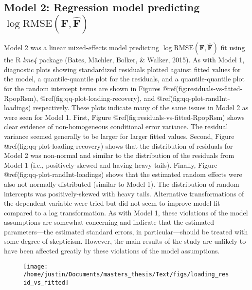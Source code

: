 \begin{appendix}
{\subsection{\texorpdfstring{Model 2: Regression model predicting
\(\log \textrm{RMSE}(\mathbf{F}, \hat{\mathbf{F}})\)}{Model 2: Regression model predicting \textbackslash log \textbackslash textrm\{RMSE\}(\textbackslash mathbf\{F\}, \textbackslash hat\{\textbackslash mathbf\{F\}\})}}\label{model-2-regression-model-predicting-log-textrmrmsemathbff-hatmathbff}}

Model 2 was a linear mixed-effects model predicting
\(\log \textrm{RMSE}(\mathbf{F}, \hat{\mathbf{F}})\) fit using the R
\emph{lme4} package (Bates, Mächler, Bolker, \& Walker, 2015). As with
Model 1, diagnostic plots showing standardized residuals plotted against
fitted values for the model, a quantile-quantile plot for the residuals,
and a quantile-quantile plot for the random intercept terms are shown in
Figures @ref(fig:residuals-vs-fitted-RpopRsm),
@ref(fig:qq-plot-loading-recovery), and
@ref(fig:qq-plot-randInt-loadings) respectively. These plots indicate
many of the same issues in Model 2 as were seen for Model 1. First,
Figure @ref(fig:residuals-vs-fitted-RpopRsm) shows clear evidence of
non-homogeneous conditional error variance. The residual variance seemed
generally to be larger for larger fitted values. Second, Figure
@ref(fig:qq-plot-loading-recovery) shows that the distribution of
residuals for Model 2 was non-normal and similar to the distribution of
the residuals from Model 1 (i.e., positively-skewed and having heavy
tails). Finally, Figure @ref(fig:qq-plot-randInt-loadings) shows that
the estimated random effects were also not normally-distributed (similar
to Model 1). The distribution of random intercepts was positively-skewed
with heavy tails. Alternative transformations of the dependent variable
were tried but did not seem to improve model fit compared to a log
transformation. As with Model 1, these violations of the model
assumptions are somewhat concerning and indicate that the estimated
parameters---the estimated standard errors, in particular---should be
treated with some degree of skepticism. However, the main results of the
study are unlikely to have been affected greatly by these violations of
the model assumptions.

\begin{figure}

{\centering \texttt{[image: /home/justin/Documents/masters\_thesis/Text/figs/loading\_resid\_vs\_fitted]} 

}
\end{figure}
\end{appendix}
